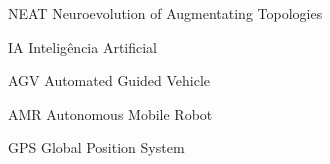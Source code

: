 \begin{siglas}
    \item[NEAT] Neuroevolution of Augmentating Topologies
    \item[IA] Intelig{\^e}ncia Artificial
    \item[AGV] Automated Guided Vehicle
    \item[AMR] Autonomous Mobile Robot
    \item[GPS] Global Position System
\end{siglas}
